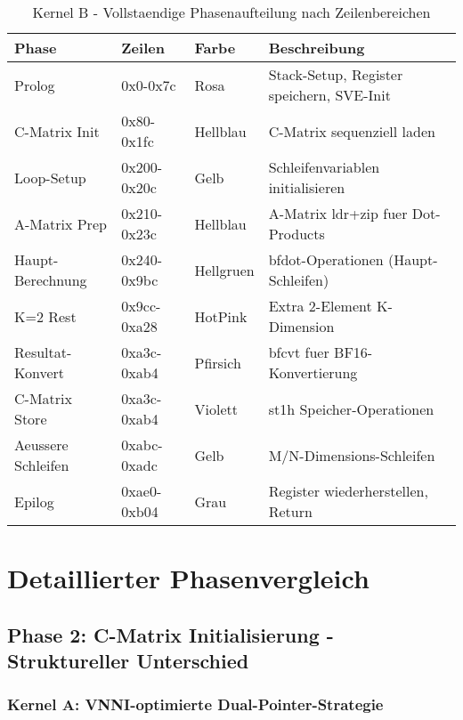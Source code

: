 \documentclass[11pt,a4paper]{article}
\begin{document}
\begin{table}[H]
\centering
\caption{Kernel B - Vollstaendige Phasenaufteilung nach Zeilenbereichen}
\footnotesize
\begin{tabular}{|l|l|l|p{6cm}|}
\hline
\textbf{Phase} & \textbf{Zeilen} & \textbf{Farbe} & \textbf{Beschreibung} \\
\hline
\rowcolor{prologue} Prolog & 0x0-0x7c & Rosa & Stack-Setup, Register speichern, SVE-Init \\
\rowcolor{matrixload} C-Matrix Init & 0x80-0x1fc & Hellblau & C-Matrix sequenziell laden \\
\rowcolor{control} Loop-Setup & 0x200-0x20c & Gelb & Schleifenvariablen initialisieren \\
\rowcolor{matrixload} A-Matrix Prep & 0x210-0x23c & Hellblau & A-Matrix ldr+zip fuer Dot-Products \\
\rowcolor{computation} Haupt-Berechnung & 0x240-0x9bc & Hellgruen & bfdot-Operationen (Haupt-Schleifen) \\
\rowcolor{remainder} K=2 Rest & 0x9cc-0xa28 & HotPink & Extra 2-Element K-Dimension \\
\rowcolor{conversion} Resultat-Konvert & 0xa3c-0xab4 & Pfirsich & bfcvt fuer BF16-Konvertierung \\
\rowcolor{storage} C-Matrix Store & 0xa3c-0xab4 & Violett & st1h Speicher-Operationen \\
\rowcolor{control} Aeussere Schleifen & 0xabc-0xadc & Gelb & M/N-Dimensions-Schleifen \\
\rowcolor{epilogue} Epilog & 0xae0-0xb04 & Grau & Register wiederherstellen, Return \\
\hline
\end{tabular}
\end{table}

\section{Detaillierter Phasenvergleich}

\subsection{Phase 2: C-Matrix Initialisierung - Struktureller Unterschied}

\subsubsection{Kernel A: VNNI-optimierte Dual-Pointer-Strategie}
\end{document}
